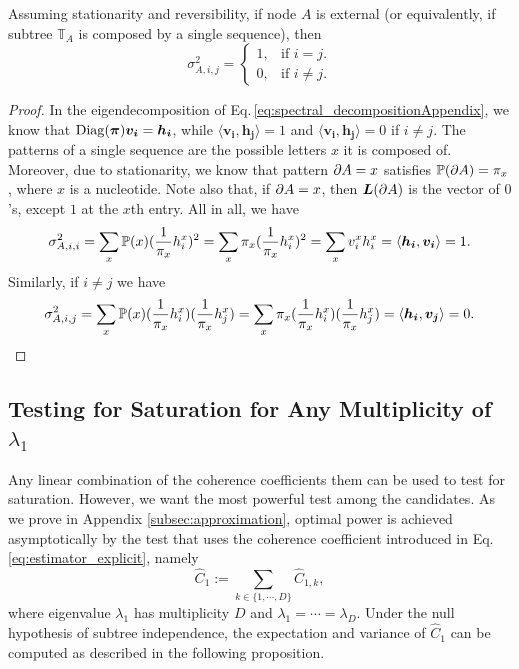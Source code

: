 \begin{appendices}
\begin{prop} \label{prop:memorySequence}
    Assuming stationarity and reversibility, if node $A$ is external (or equivalently, if subtree $\mathbb{T}_A$ is composed by a single sequence), then \[
    \sigma^2_{A,i,j} =  \begin{cases}
    1,  & \text{if $i=j$}.\\
    0,&  \text{if $i\neq j$}.
    \end{cases}
    \]
\end{prop}
\begin{proof}
   In the eigendecomposition of Eq.\,\eqref{eq:spectral_decompositionAppendix}, we know that $\operatorname{Diag}(\bm{\pi}) \bm{v_i} = \bm{h_i}$, while $\langle \bm{v_i} ,\bm{h_j} \rangle = 1$ and $\langle \bm{v_i} ,\bm{h_j} \rangle = 0$ if $i \neq j$. The patterns of a single sequence are the possible letters $x$ it is composed of.  Moreover, due to stationarity, we know that pattern ${\partial A} = x$ satisfies $\mathbb{P}({\partial A}) = \pi_x$, where $x$ is a nucleotide. Note also that, if ${\partial A} = x$,  then $\bm{L}({\partial A})$ is the vector of $0$'s, except $1$ at the $x$th entry. All in all, we have
\begin{equation}
\sigma^2_{A,i,i} = \sum_x \mathbb{P}(x) (\frac{1}{\pi_x} h_i^x )^2 = \sum_x \pi_x (\frac{1}{\pi_x} h_i^x )^2 = \sum_x v_i^x h_i^x = \langle \bm{h_i}, \bm{v_i} \rangle= 1.
\end{equation}
Similarly, if $i \neq j$ we have 
\begin{equation}
  \sigma^2_{A,i,j}   = \sum_x \mathbb{P}(x) (\frac{1}{\pi_x} h_i^x )(\frac{1}{\pi_x} h_j^x ) = \sum_x \pi_x (\frac{1}{\pi_x} h_i^x )(\frac{1}{\pi_x} h_j^x ) = \langle \bm{h_i}, \bm{v_j} \rangle = 0.
\end{equation}
\end{proof}


\subsection{Testing for Saturation for Any Multiplicity of \texorpdfstring{$\lambda_1$}{l1}}
\label{sec:multiplicityGreaterThan1}

Any linear combination of the coherence coefficients them can be used to test for saturation. However, we want the most powerful test among the candidates. As we prove in Appendix \ref{subsec:approximation}, optimal power is achieved asymptotically by the test that uses the coherence coefficient introduced in Eq.\,\eqref{eq:estimator_explicit}, namely
\begin{equation}\label{eq:dominant_coherence}
\hat{C}_1:= \sum_{k \in \{ 1, \cdots , D \}}\hat{C}_{1, k},
\end{equation} 
where eigenvalue $\lambda_1$ has multiplicity $D$ and $\lambda_1 = \cdots = \lambda_D$. Under the null hypothesis of subtree independence, the expectation and variance of $\hat{C}_1$ can be computed as described in the following proposition.


\end{appendices}
